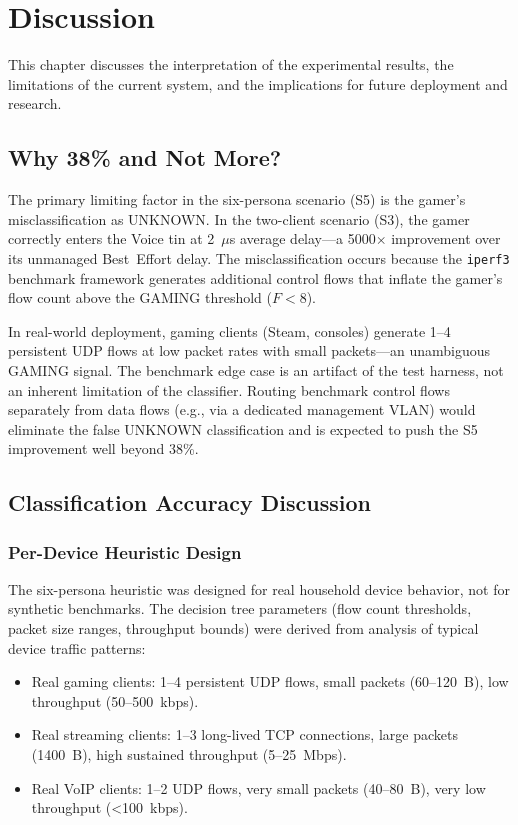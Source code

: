 
\chapter{Discussion}\label{chapter:discussion}

This chapter discusses the interpretation of the experimental results, the limitations of the current system, and the implications for future deployment and research.

\section{Why 38\% and Not More?}

The primary limiting factor in the six-persona scenario (S5) is the gamer's misclassification as UNKNOWN. In the two-client scenario (S3), the gamer correctly enters the Voice tin at 2~$\mu$s average delay---a 5000$\times$ improvement over its unmanaged Best~Effort delay. The misclassification occurs because the \texttt{iperf3} benchmark framework generates additional control flows that inflate the gamer's flow count above the GAMING threshold ($F < 8$).

In real-world deployment, gaming clients (Steam, consoles) generate 1--4 persistent UDP flows at low packet rates with small packets---an unambiguous GAMING signal. The benchmark edge case is an artifact of the test harness, not an inherent limitation of the classifier. Routing benchmark control flows separately from data flows (e.g., via a dedicated management VLAN) would eliminate the false UNKNOWN classification and is expected to push the S5 improvement well beyond 38\%.

\section{Classification Accuracy Discussion}

\subsection{Per-Device Heuristic Design}

The six-persona heuristic was designed for real household device behavior, not for synthetic benchmarks. The decision tree parameters (flow count thresholds, packet size ranges, throughput bounds) were derived from analysis of typical device traffic patterns:

\begin{itemize}
  \item Real gaming clients: 1--4 persistent UDP flows, small packets (60--120~B), low throughput (50--500~kbps).
  \item Real streaming clients: 1--3 long-lived TCP connections, large packets (1400~B), high sustained throughput (5--25~Mbps).
  \item Real VoIP clients: 1--2 UDP flows, very small packets (40--80~B), very low throughput (<100~kbps).
\end{itemize}

